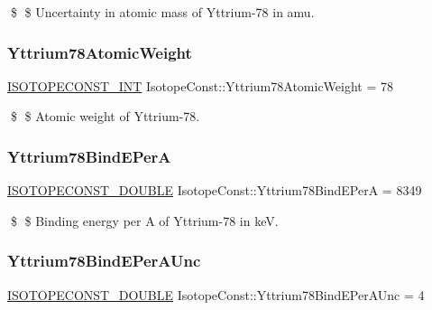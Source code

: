 \$ \$ Uncertainty in atomic mass of Yttrium-\/78 in amu. \mbox{\label{group___isotope_const-_yttrium-_y78_gadca4ba34dd02f020b9eeb4a2a775d875}} 
\subsubsection{\texorpdfstring{Yttrium78\+Atomic\+Weight}{Yttrium78AtomicWeight}}
{\footnotesize\ttfamily \mbox{\hyperlink{group___isotope_const-_macros_ga5f18360b3e99483a35c32d789e62621c}{I\+S\+O\+T\+O\+P\+E\+C\+O\+N\+S\+T\+\_\+\+I\+NT}} Isotope\+Const\+::\+Yttrium78\+Atomic\+Weight = 78}

\$ \$ Atomic weight of Yttrium-\/78. \mbox{\label{group___isotope_const-_yttrium-_y78_ga6acde79b6616583d78bf1073b8abc306}} 
\subsubsection{\texorpdfstring{Yttrium78\+Bind\+E\+PerA}{Yttrium78BindEPerA}}
{\footnotesize\ttfamily \mbox{\hyperlink{group___isotope_const-_macros_ga8f45a7272ce02c0b4c65c44636ed719a}{I\+S\+O\+T\+O\+P\+E\+C\+O\+N\+S\+T\+\_\+\+D\+O\+U\+B\+LE}} Isotope\+Const\+::\+Yttrium78\+Bind\+E\+PerA = 8349}

\$ \$ Binding energy per A of Yttrium-\/78 in keV. \mbox{\label{group___isotope_const-_yttrium-_y78_ga8678dad58a4f3b3fee9c6cff1a2a9460}} 
\subsubsection{\texorpdfstring{Yttrium78\+Bind\+E\+Per\+A\+Unc}{Yttrium78BindEPerAUnc}}
{\footnotesize\ttfamily \mbox{\hyperlink{group___isotope_const-_macros_ga8f45a7272ce02c0b4c65c44636ed719a}{I\+S\+O\+T\+O\+P\+E\+C\+O\+N\+S\+T\+\_\+\+D\+O\+U\+B\+LE}} Isotope\+Const\+::\+Yttrium78\+Bind\+E\+Per\+A\+Unc = 4}

